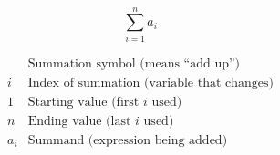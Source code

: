 \documentclass[10pt]{article}
\begin{document}
\vspace{-0.6cm}

\hrulefill\\


{
\[
\sum_{i=1}^{n} a_i
\]

\[
\begin{array}{lcl}
  &\text{Summation symbol (means “add up”)}\\[6pt]
i &\text{Index of summation (variable that changes)}\\[6pt]
1 & \text{Starting value (first $i$ used)}\\[6pt]
n & \text{Ending value (last $i$ used)}\\[6pt]
a_i &  \text{Summand (expression being added)}
\end{array}
\]
}

\vfill
\end{document}
